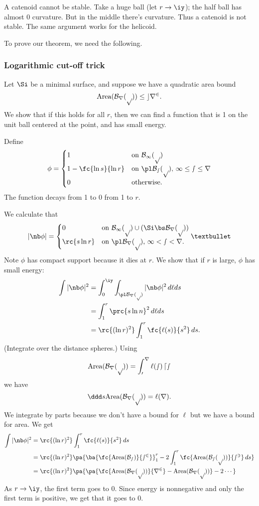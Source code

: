 A catenoid cannot be stable. Take a huge ball (let $r\to \iy$); the half ball has almost 0 curvature. But in the middle there's curvature. Thus a catenoid is not stable. The same argument works for the helicoid.

To prove our theorem, we need the following.
\subsubsection{Logarithmic cut-off trick}
Let $\Si$ be a minimal surface, and suppose we have a quadratic area bound 
\[\text{Area}(\cal B_r(p))\le cr^2.\] 
We show that if this holds for all $r$, then we can find a function that is 1 on the unit ball centered at the point, and has small energy.

Define
\[
\phi=\begin{cases}
1&\text{on }\cal B_1(p)\\
1-\fc{\ln s}{\ln r}&\text{on }\pl \cal B_s(p),\, 1\le s\le r\\
0 &\text{otherwise.}
\end{cases}
\]
The function decays from 1 to 0 from 1 to $r$. 


We calculate that
\[
|\nb \phi|=
\begin{cases}
0&\text{on }\cal B_1(p)\cup (\Si\bs \cal B_r(p))\\
\rc{s\ln r}&\text{on }\pl\cal B_r(p),\,1<s<r.
\end{cases}•
\]
Note $\phi$ has compact support because it dies at $r$. We show that if $r$ is large, $\phi$ has small energy:
\begin{align*}
\int |\nb \phi|^2
&=\int_0^{\iy}\int_{\pl \cal B_r(p)} |\nb \phi|^2\,d\ell ds\\
&=\int_1^r \prc{s\ln n}^2\,d\ell ds\\
&=\rc{(\ln r)^2} \int_1^r \fc{\ell (s)}{s^2}\,ds.
\end{align*}
(Integrate over the distance spheres.)
Using 
\[
\text{Area}(\cal B_r(p))=\int_0^r \ell(s)\,ds
\]
we have
\[
\ddd s\text{Area}(\cal B_r(p))=\ell(r).
\]
We integrate by parts because we don't have a bound for $\ell$ but we have a bound for area. We get
\begin{align*}
\int |\nb \phi|^2
&=\rc{(\ln r)^2} \int_1^r \fc{\ell(s)}{s^2}\,ds\\
&=\rc{(\ln r)^2} \pa{
\ba{\fc{\text{Area}(\cal B_s)}{s^2}}^r_1 - 2\int_1^r \fc{\text{Area}(\cal B_s(p))}{s^3}\,ds
}\\
&=\rc{(\ln r)^2} \pa{\pa{\fc{\text{Area}(\cal B_r(p))}{r^2}-\text{Area}(\cal B_r(p))}-2\cdots}
\end{align*}
As $r\to \iy$, the first term goes to 0. %
Since energy is nonnegative and only the first term is positive, we get that it goes to 0.

